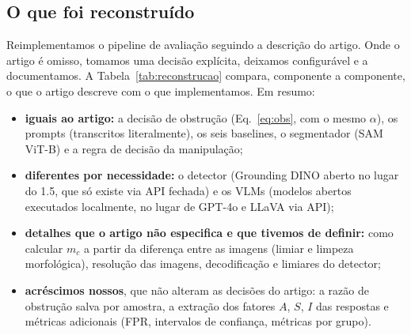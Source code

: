 \documentclass[journal,onecolumn]{IEEEtran}
\begin{document}
\subsection{O que foi reconstruído}
Reimplementamos o pipeline de avaliação seguindo a descrição do artigo. Onde o artigo é omisso,
tomamos uma decisão explícita, deixamos configurável e a documentamos. A Tabela~\ref{tab:reconstrucao}
compara, componente a componente, o que o artigo descreve com o que implementamos. Em resumo:
\begin{itemize}
\item \textbf{iguais ao artigo:} a decisão de obstrução (Eq.~\eqref{eq:obs}, com o mesmo $\alpha$), os
  prompts (transcritos literalmente), os seis baselines, o segmentador (SAM ViT-B) e a regra de decisão
  da manipulação;
\item \textbf{diferentes por necessidade:} o detector (Grounding DINO aberto no lugar do 1.5, que só
  existe via API fechada) e os VLMs (modelos abertos executados localmente, no lugar de GPT-4o e
  LLaVA via API);
\item \textbf{detalhes que o artigo não especifica e que tivemos de definir:} como calcular $m_c$ a
  partir da diferença entre as imagens (limiar e limpeza morfológica), resolução das imagens,
  decodificação e limiares do detector;
\item \textbf{acréscimos nossos}, que não alteram as decisões do artigo: a razão de obstrução salva por
  amostra, a extração dos fatores $A$, $S$, $I$ das respostas e métricas adicionais (FPR, intervalos
  de confiança, métricas por grupo).
\end{itemize}
\end{document}
